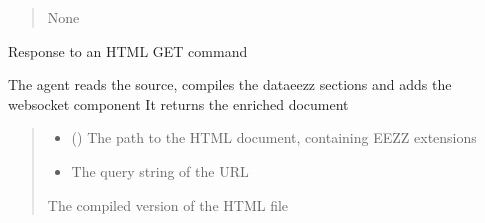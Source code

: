 \documentclass[letterpaper,10pt,english]{sphinxmanual}
\begin{document}
\begin{savenotes}
\begin{fulllineitems}
\begin{savenotes}
\begin{fulllineitems}
\begin{quote}
\begin{description}
\begin{itemize}
\end{itemize}

\sphinxAtStartPar
None

\end{description}\end{quote}

\end{fulllineitems}\end{savenotes}


\begin{savenotes}\begin{fulllineitems}
\label{\detokenize{eezz:eezz.http_agent.THttpAgent.do_get}}
\pysigstartsignatures
{}
\pysigstopsignatures
\sphinxAtStartPar
Response to an HTML GET command

\sphinxAtStartPar
The agent reads the source, compiles the data\sphinxhyphen{}eezz sections and adds the web\sphinxhyphen{}socket component
It returns the enriched document
\begin{quote}\begin{description}
\begin{itemize}
\item {} 
\sphinxAtStartPar
{} () \textendash{} The path to the HTML document, containing EEZZ extensions

\item {} 
\sphinxAtStartPar
{} \textendash{} The query string of the URL

\end{itemize}

\sphinxAtStartPar
The compiled version of the HTML file

\end{description}\end{quote}

\end{fulllineitems}\end{savenotes}


\end{fulllineitems}
\end{savenotes}
\end{document}
